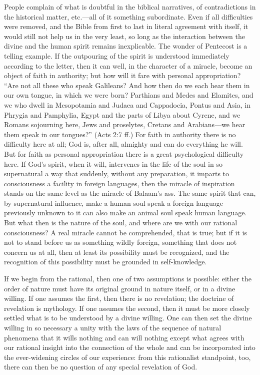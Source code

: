 \documentclass[12pt,a4paper,openany]{book}
\newcommand{\opage}[1]{\marginnote{\footnotesize\textit{[#1]}}}
\begin{document}
People complain of what is doubtful in the biblical narratives, of
contradictions in the historical matter, etc.---all of it something
subordinate. Even if all difficulties were removed, and the Bible from
first to last in literal agreement with itself, it would still not help
us in the very least, so long as the interaction between the divine and
the human spirit remains inexplicable. The wonder of Pentecost is a
telling example. If the outpouring of the spirit is understood
immediately according to the letter, then it can well, in the character
of a miracle, become an object of faith in authority; but how will it
fare with personal appropriation? ``\opage{37}Are not all these who speak
Galileans? And how then do we each hear them in our own tongue, in which
we were born? Parthians and Medes and Elamites, and we who dwell in
Mesopotamia and Judaea and Cappadocia, Pontus and Asia, in Phrygia and
Pamphylia, Egypt and the parts of Libya about Cyrene, and we Romans
sojourning here, Jews and proselytes, Cretans and Arabians---we hear them
speak in our tongues?'' (Acts 2:7 ff.) For faith in authority there is
no difficulty here at all; God is, after all, almighty and can do
everything he will. But for faith as personal appropriation there is a
great psychological difficulty here. If God's spirit, when it will,
intervenes in the life of the soul in so supernatural a way that
suddenly, without any preparation, it imparts to consciousness a
facility in foreign languages, then the miracle of inspiration stands on
the same level as the miracle of Balaam's ass.
The same spirit that can, by supernatural influence, make a human soul
speak a foreign language previously unknown to it can also make an
animal soul speak human language. But what then is the nature of the
soul, and where are we with our rational consciousness? A real miracle
cannot be comprehended, that is true; but if it is not to stand before
us as something wildly foreign, something that does not concern us at
all, then at least its possibility must be recognized, and the
recognition of this possibility must be grounded in self-knowledge.

If we begin from the rational, then one of two assumptions is possible:
either the order of nature must have its original ground in nature
itself, or in a divine willing. If one assumes the first, then there is
no revelation; the doctrine of revelation is mythology. If one assumes
\opage{38}the second, then it must be more closely settled what is to be
understood by a divine willing. One can then set the divine willing in
so necessary a unity with the laws of the sequence of natural phenomena
that it wills nothing and can will nothing except what agrees with our
rational insight into the connection of the whole and can be
incorporated into the ever-widening circles of our experience: from this
rationalist standpoint, too, there can then be no question of any
special revelation of God.
\end{document}
